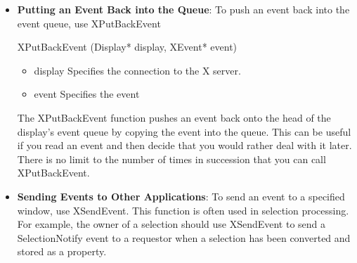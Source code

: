 \documentclass{report}
\begin{document}
\begin{itemize}
            \bigbreak \noindent 
            \begin{cppcode}
            Bool XCheckTypedWindowEvent(Display* display, Window w, int event_type, XEvent* event_return)
            \end{cppcode}
            \begin{itemize}
                \item display Specifies the connection to the X server.
                \item $w$ Specifies the window.
                \item event\_type Specifies the event type to be compared.
                \item event\_return Returns the matched event’s associated structure
            \end{itemize}
            The XCheckTypedWindowEvent function searches the event queue and then any events available on the server connection for the first event that matches the specified type and window. If it finds a match, XCheckTypedWindowEvent removes the event from the queue, copies it into the specified XEvent structure, and returns True. The other events in the queue are not discarded. If the event is not available, XCheckTypedWindowEvent returns False, and the output buffer will have been flushed.
        \item \textbf{Putting an Event Back into the Queue}: To push an event back into the event queue, use XPutBackEvent
            \bigbreak \noindent 
            \begin{cppcode}
            XPutBackEvent (Display* display, XEvent* event)
            \end{cppcode}
            \begin{itemize}
                \item display Specifies the connection to the X server.
                \item event Specifies the event
            \end{itemize}
            The XPutBackEvent function pushes an event back onto the head of the display’s event queue by copying the event into the queue. This can be useful if you read an event and then decide that you would rather deal with it later. There is no limit to the number of times in succession that you can call XPutBackEvent.
        \item \textbf{Sending Events to Other Applications}: To send an event to a specified window, use XSendEvent. This function is often used in selection processing. For example, the owner of a selection should use XSendEvent to send a SelectionNotify event to a requestor when a selection has been converted and stored as a property.

\end{itemize}
\end{document}
